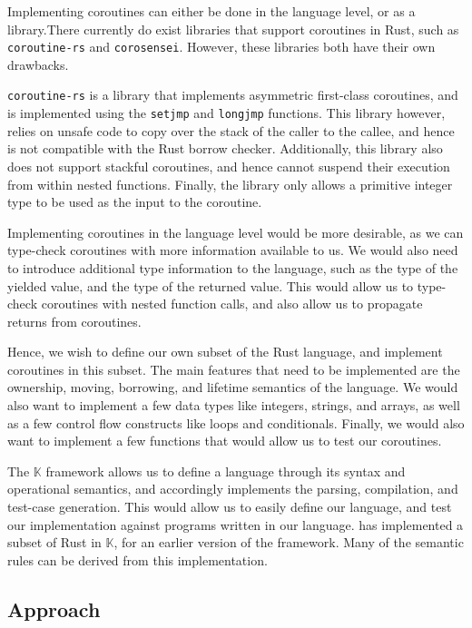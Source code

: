 \documentclass[review,twocolumn,preprint]{sigplanconf}
\begin{document}
Implementing coroutines can either be done in the language level, or as a library.There currently do exist libraries that support coroutines in Rust, such as \verb!coroutine-rs! and \verb!corosensei!. However, these libraries both have their own drawbacks.

\verb!coroutine-rs! is a library that implements asymmetric first-class coroutines, and is implemented using the \verb!setjmp! and \verb!longjmp! functions. This library however, relies on unsafe code to copy over the stack of the caller to the callee, and hence is not compatible with the Rust borrow checker. Additionally, this library also does not support stackful coroutines, and hence cannot suspend their execution from within nested functions. Finally, the library only allows a primitive integer type to be used as the input to the coroutine.

Implementing coroutines in the language level would be more desirable, as we can type-check coroutines with more information available to us. We would also need to introduce additional type information to the language, such as the type of the yielded value, and the type of the returned value. This would allow us to type-check coroutines with nested function calls, and also allow us to propagate returns from coroutines.

Hence, we wish to define our own subset of the Rust language, and implement coroutines in this subset. The main features that need to be implemented are the ownership, moving, borrowing, and lifetime semantics of the language. We would also want to implement a few data types like integers, strings, and arrays, as well as a few control flow constructs like loops and conditionals. Finally, we would also want to implement a few functions that would allow us to test our coroutines.

The $\mathbb{K}$ framework allows us to define a language through its syntax and operational semantics, and accordingly implements the parsing, compilation, and test-case generation. This would allow us to easily define our language, and test our implementation against programs written in our language. \citet{Krust2018} has implemented a subset of Rust in $\mathbb{K}$, for an earlier version of the framework. Many of the semantic rules can be derived from this implementation.

\subsection{Approach}
\end{document}
